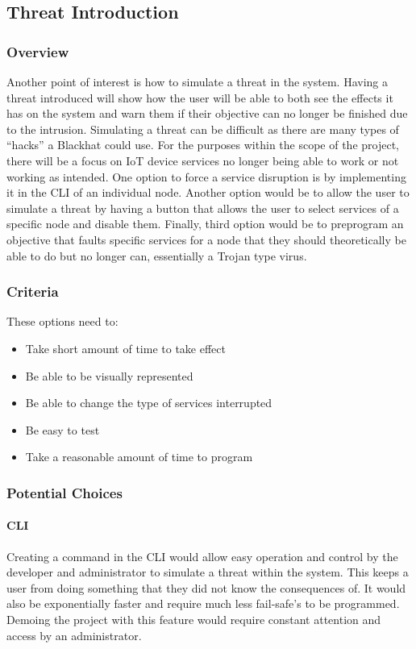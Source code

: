 \subsection{Threat Introduction}
\subsubsection{Overview}
Another point of interest is how to simulate a threat in the system. Having a threat introduced  will show how the user will be able to both see the effects it has on the system and warn them if their objective can no longer be finished due to the intrusion. Simulating a threat can be difficult as there are many types of “hacks” a Blackhat could use. For the purposes within the scope of the project, there will be a focus on IoT device services no longer being able to work or not working as intended. One option to force a service disruption is by implementing it in the CLI of an individual node. Another option would be to allow the user to simulate a threat by having a button that allows the user to select services of a specific node and disable them. Finally, third option would be to preprogram an objective that faults specific services for a node that they should theoretically be able to do but no longer can, essentially a Trojan type virus. 
\subsubsection{Criteria}
These options need to:
\begin{itemize}
    \item Take short amount of time to take effect
    \item Be able to be visually represented
    \item Be able to change the type of services interrupted
    \item Be easy to test
    \item Take a reasonable amount of time to program
\end{itemize}
\subsubsection{Potential Choices}
\paragraph{CLI}
Creating a command in the CLI would allow easy operation and control by the developer and administrator to simulate a threat within the system. This keeps a user from doing something that they did not know the consequences of. It would also be exponentially faster and require much less fail-safe’s to be programmed. Demoing the project with this feature would require constant attention and access by an administrator.
